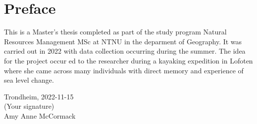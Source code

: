 


\section*{Preface}
This is a Master's thesis completed as part of the study program Natural Resources Management MSc at NTNU in the deparment of Geography. It was carried out in 2022 with data collection occurring during the summer. The idea for the project occur ed to the researcher during a kayaking expedition in Lofoten where she came across many individuals with direct memory and experience of sea level change. \\[2cm]

\begin{center}
Trondheim, 2022-11-15\\[1pc]

(Your signature)\\[1pc]
Amy Anne McCormack 
\end{center}

\documentclass{article}
\usepackage{graphicx}
\graphicspath{ {./images/} }
\texttt{[image: fig/to use signature png]}